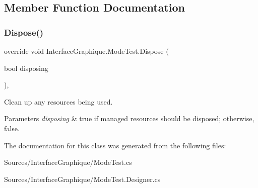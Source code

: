\subsection{Member Function Documentation}
\hypertarget{class_interface_graphique_1_1_mode_test_a06f68e45851d96953a8413bd1d85a59c}{}\label{class_interface_graphique_1_1_mode_test_a06f68e45851d96953a8413bd1d85a59c} 
\subsubsection{\texorpdfstring{Dispose()}{Dispose()}}
{\footnotesize\ttfamily override void Interface\+Graphique.\+Mode\+Test.\+Dispose (\begin{DoxyParamCaption}\item[{bool}]{disposing }\end{DoxyParamCaption})\hspace{0.3cm}{\ttfamily [inline]}, {\ttfamily [protected]}}



Clean up any resources being used. 


\begin{DoxyParams}{Parameters}
{\em disposing} & true if managed resources should be disposed; otherwise, false.\\
\hline
\end{DoxyParams}


The documentation for this class was generated from the following files\+:\begin{DoxyCompactItemize}
\item 
Sources/\+Interface\+Graphique/Mode\+Test.\+cs\item 
Sources/\+Interface\+Graphique/Mode\+Test.\+Designer.\+cs\end{DoxyCompactItemize}
